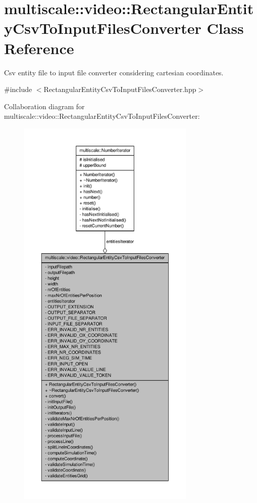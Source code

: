 \hypertarget{classmultiscale_1_1video_1_1RectangularEntityCsvToInputFilesConverter}{\section{multiscale\-:\-:video\-:\-:\-Rectangular\-Entity\-Csv\-To\-Input\-Files\-Converter \-Class \-Reference}
\label{classmultiscale_1_1video_1_1RectangularEntityCsvToInputFilesConverter}
}


\-Csv entity file to input file converter considering cartesian coordinates.  




{\ttfamily \#include $<$\-Rectangular\-Entity\-Csv\-To\-Input\-Files\-Converter.\-hpp$>$}



\-Collaboration diagram for multiscale\-:\-:video\-:\-:\-Rectangular\-Entity\-Csv\-To\-Input\-Files\-Converter\-:\nopagebreak
\begin{figure}[H]
\begin{center}
\leavevmode
\includegraphics[height=550pt]{classmultiscale_1_1video_1_1RectangularEntityCsvToInputFilesConverter__coll__graph}
\end{center}
\end{figure}
